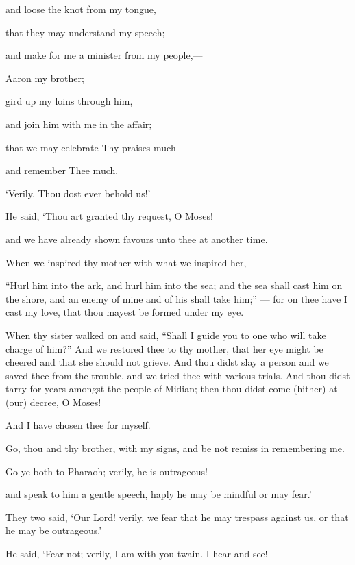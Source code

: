 \documentclass[fontsize=14pt, letterpaper, notitlepage, openany, DIV=12]{scrbook} %
\begin{document}
\noindent[20:27]
and loose the knot from my tongue,

\noindent[20:28]
that they may understand my speech;

\noindent[20:29]
and make for me a minister from my people,---

\noindent[20:30]
Aaron my brother;

\noindent[20:31]
gird up my loins through him,

\noindent[20:32]
and join him with me in the affair;

\noindent[20:33]
that we may celebrate Thy praises much

\noindent[20:34]
and remember Thee much.

\noindent[20:35]
`Verily, Thou dost ever behold us!'

\noindent[20:36]
He said, `Thou art granted thy request, O Moses!

\noindent[20:37]
and we have already shown favours unto thee at another time.

\noindent[20:38]
When we inspired thy mother with what we inspired her,

\noindent[20:39]
``Hurl him into the ark, and hurl him into the sea; and the sea shall cast him on the shore,
and an enemy of mine and of his shall take him;'' --- for on thee have I cast my love, that thou
mayest be formed under my eye.

\noindent[20:40]
When thy sister walked on and said, ``Shall I guide you to one who will take charge of
him?'' And we restored thee to thy mother, that her eye might be cheered and that she should not
grieve. And thou didst slay a person and we saved thee from the trouble, and we tried thee with
various trials. And thou didst tarry for years amongst the people of Midian; then thou didst come
(hither) at (our) decree, O Moses!

\noindent[20:41]
And I have chosen thee for myself.

\noindent[20:42]
Go, thou and thy brother, with my signs, and be not remiss in remembering me.

\noindent[20:43]
Go ye both to Pharaoh; verily, he is outrageous!

\noindent[20:44]
and speak to him a gentle speech, haply he may be mindful or may fear.'

\noindent[20:45]
They two said, `Our Lord! verily, we fear that he may trespass against us, or that he may
be outrageous.'

\noindent[20:46]
He said, `Fear not; verily, I am with you twain. I hear and see!
\end{document}
